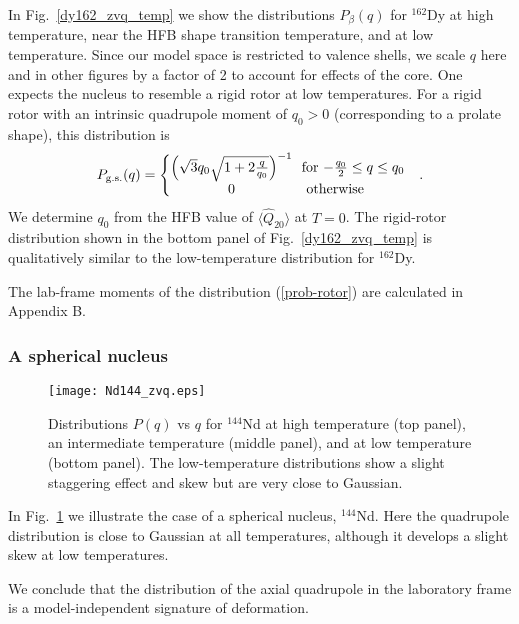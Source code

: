 \documentclass[prc,twocolumn,aps,showpacs,floatfix,nofootinbib,letterpaper,preprintnumbers]{revtex4-1}
\begin{document}
In Fig.~\ref{dy162_zvq_temp} we show the distributions $P_\beta(q)$ for $^{162}$Dy at high temperature, near the HFB shape transition temperature, and at low temperature.  Since our model space is restricted to valence shells, we scale $q$  here and in other figures by a factor of 2 to account for effects of the core. One expects the nucleus to resemble a rigid rotor at low temperatures. For a rigid rotor with an intrinsic quadrupole moment of $q_0>0$ (corresponding to a prolate shape), this distribution is~\cite{al14}
\begin{eqnarray}\label{prob-rotor}
P_{\rm g.s.}(q) =  \left\{ \!\!\! \begin{array}{cl}  
\left(\sqrt{3} q_0 \sqrt{1 +2 {q\over q_0}}\right)^{-1}  & \! \! \mbox{for $-{q_0 
\over 2} \leq q \leq q_0$}  \\
 0  & \mathrm{otherwise}  \end{array}  \right. \;.
 \end{eqnarray}
We determine $q_0$ from the HFB value of $\langle \hat{Q}_{20}\rangle$ at $T=0$. The rigid-rotor distribution shown in the bottom panel of Fig.~\ref{dy162_zvq_temp} is qualitatively similar to the low-temperature distribution for $^{162}$Dy.

The lab-frame moments of the distribution (\ref{prob-rotor}) are calculated in Appendix B. 

\subsubsection{A spherical nucleus} 

\begin{figure}[h!]
    \texttt{[image: Nd144\_zvq.eps]}
    \caption{Distributions $P(q)$  vs $q$ for $^{144}$Nd at high temperature (top panel), an intermediate temperature (middle panel), and at low temperature (bottom panel). The low-temperature distributions show a slight staggering effect and skew but are very close to Gaussian.}
    \label{nd144_zvq_temp}
\end{figure}

In Fig.~\ref{nd144_zvq_temp} we illustrate the case of a spherical nucleus, $^{144}$Nd. Here the quadrupole distribution is close to Gaussian at all temperatures, although it develops a slight skew at low temperatures.
 
We conclude that the distribution of the axial quadrupole in the laboratory frame is a model-independent signature of deformation.
\end{document}
